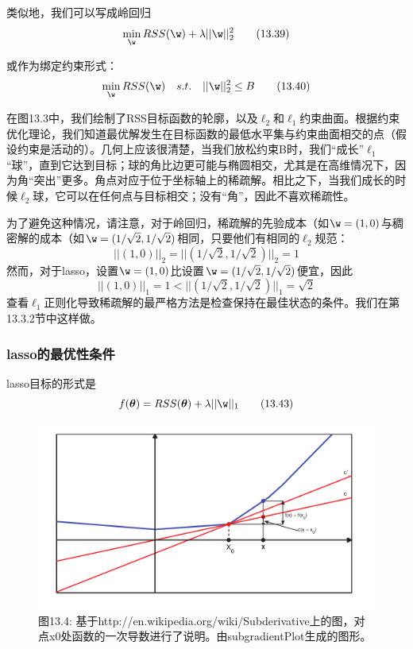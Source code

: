 \documentclass[a4paper]{article}
\begin{document}
类似地，我们可以写成岭回归
\begin{equation}
	\min_\w RSS(\w)+\lambda||\w||_2^2\tag{13.39}
\end{equation}

或作为绑定约束形式：
\begin{equation}
\min_\w RSS(\w)\ \ \ s.t.\ \ \ ||\w||_2^2\le B\tag{13.40}
\end{equation}

在图13.3中，我们绘制了RSS目标函数的轮廓，以及$\ell_2$和$\ell_1$约束曲面。根据约束优化理论，我们知道最优解发生在目标函数的最低水平集与约束曲面相交的点（假设约束是活动的）。几何上应该很清楚，当我们放松约束B时，我们“成长”$\ell_1$“球”，直到它达到目标；球的角比边更可能与椭圆相交，尤其是在高维情况下，因为角“突出”更多。角点对应于位于坐标轴上的稀疏解。相比之下，当我们成长的时候$\ell_2$球，它可以在任何点与目标相交；没有“角”，因此不喜欢稀疏性。

为了避免这种情况，请注意，对于岭回归，稀疏解的先验成本（如$\w=(1,0)$与稠密解的成本（如$\w=(1/\sqrt{2},1/\sqrt{2})$相同，只要他们有相同的$\ell_2$规范：
\begin{equation}
	||(1,0)||_2=||(1/\sqrt{2},1/\sqrt{2})||_2=1\tag{13.41}
\end{equation}
然而，对于lasso，设置$\w=(1,0)$比设置$\w=(1/\sqrt{2},1/\sqrt{2})$便宜，因此
\begin{equation}
||(1,0)||_1=1< ||(1/\sqrt{2},1/\sqrt{2})||_1=\sqrt{2}\tag{13.42}
\end{equation}
查看$\ell_1$正则化导致稀疏解的最严格方法是检查保持在最佳状态的条件。我们在第13.3.2节中这样做。

\subsubsection{lasso的最优性条件}
lasso目标的形式是
\begin{equation}
	f(\boldsymbol{\theta})=RSS(\boldsymbol{\theta})+\lambda||\w||_1\tag{13.43}
\end{equation}

\begin{figure}[h]
	\centering
	\includegraphics[width=0.7\linewidth]{fig13/figure4}
	\caption*{图13.4: 基于http://en.wikipedia.org/wiki/Subderivative上的图，对点x0处函数的一次导数进行了说明。由subgradientPlot生成的图形。}
\end{figure}
\end{document}
